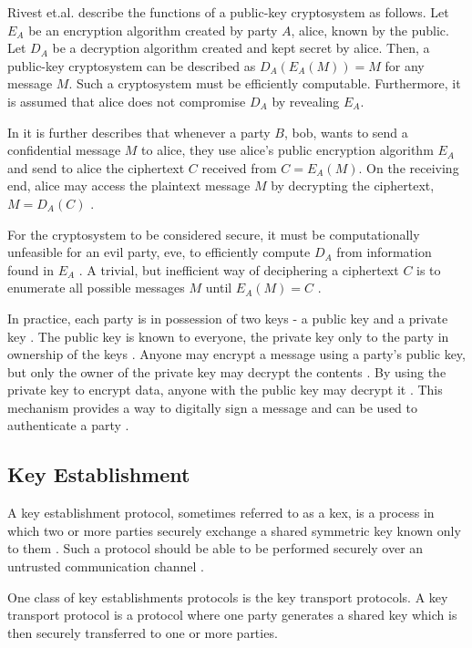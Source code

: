 Rivest et.al. \cite{rsa1977} describe the functions of a public-key cryptosystem as follows. Let $E_A$ be an encryption algorithm created by party $A$, \gls{alice}, known by the public. Let $D_A$ be a decryption algorithm created and kept secret by \gls{alice}. Then, a public-key cryptosystem can be described as $D_A(E_A(M))=M$ for any message $M$. Such a cryptosystem must be efficiently computable. Furthermore, it is assumed that \gls{alice} does not compromise $D_A$ by revealing $E_A$.

In \cite{rsa1977} it is further describes that whenever a party $B$, \gls{bob}, wants to send a confidential message $M$ to \gls{alice}, they use \gls{alice}'s public encryption algorithm $E_A$ and send to \gls{alice} the ciphertext $C$ received from $C=E_A(M)$. On the receiving end, \gls{alice} may access the plaintext message $M$ by decrypting the ciphertext, $M=D_A(C)$ \cite{rsa1977}.

For the cryptosystem to be considered secure, it must be computationally unfeasible for an evil party, \gls{eve}, to efficiently compute $D_A$ from information found in $E_A$ \cite{rsa1977}. A trivial, but inefficient way of deciphering a ciphertext $C$ is to enumerate all possible messages $M$ until $E_A(M)=C$ \cite{rsa1977}.

In practice, each party is in possession of two keys - a public key and a private key \cite{bernstein2017}. The public key is known to everyone, the private key only to the party in ownership of the keys \cite{bernstein2017}. Anyone may encrypt a message using a party's public key, but only the owner of the private key may decrypt the contents \cite{bernstein2017}. By using the private key to encrypt data, anyone with the public key may decrypt it \cite{bernstein2017}. This mechanism provides a way to digitally sign a message and can be used to authenticate a party \cite{bernstein2017}.

\subsection{Key Establishment}

A key establishment protocol, sometimes referred to as a \gls{kex}, is a process in which two or more parties securely exchange a shared symmetric key known only to them \cite{boyd2020}. Such a protocol should be able to be performed securely over an untrusted communication channel \cite{boyd2020}.

One class of key establishments protocols is the key transport protocols. A key transport protocol is a protocol where one party generates a shared key which is then securely transferred to one or more parties\cite{boyd2020}.

